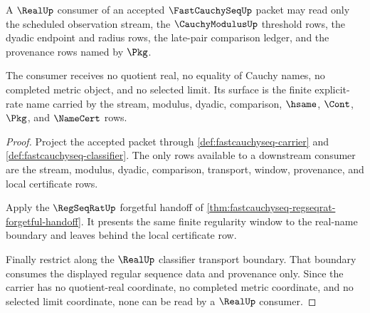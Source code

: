 \begin{theorem}
\label{thm:fastcauchyseq-real-seal-consumer-boundary}
A $\RealUp$ consumer of an accepted $\FastCauchySeqUp$ packet may read only the scheduled observation stream, the $\CauchyModulusUp$ threshold rows, the dyadic endpoint and radius rows, the late-pair comparison ledger, and the provenance rows named by $\Pkg$.

The consumer receives no quotient real, no equality of Cauchy names, no completed metric object, and no selected limit. Its surface is the finite explicit-rate name carried by the stream, modulus, dyadic, comparison, $\hsame$, $\Cont$, $\Pkg$, and $\NameCert$ rows.
\end{theorem}
\begin{proof}
Project the accepted packet through \autoref{def:fastcauchyseq-carrier} and \autoref{def:fastcauchyseq-classifier}. The only rows available to a downstream consumer are the stream, modulus, dyadic, comparison, transport, window, provenance, and local certificate rows.

Apply the $\RegSeqRatUp$ forgetful handoff of \autoref{thm:fastcauchyseq-regseqrat-forgetful-handoff}. It presents the same finite regularity window to the real-name boundary and leaves behind the local certificate row.

Finally restrict along the $\RealUp$ classifier transport boundary. That boundary consumes the displayed regular sequence data and provenance only. Since the carrier has no quotient-real coordinate, no completed metric coordinate, and no selected limit coordinate, none can be read by a $\RealUp$ consumer.
\end{proof}

